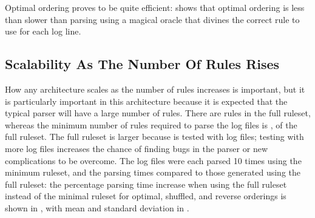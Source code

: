 Optimal ordering proves to be quite efficient:  shows that optimal ordering is less than
 slower than parsing
using a magical oracle that divines the correct rule to use for each log
line.






\FloatBarrier{}

\subsection{Scalability As The Number Of Rules Rises}

\label{scalability as the number of rules rises}

How any architecture scales as the number of rules increases is important,
but it is particularly important in this architecture because it is
expected that the typical parser will have a large number of rules.  There
are \numberOFrules{} rules in the full \parsername{} ruleset, whereas the
minimum number of rules required to parse the \numberOFlogFILES{} log files
is \numberOFrulesMINIMUM{}, \numberOFrulesMINIMUMpercentage{} of the full
ruleset.  The full ruleset is larger because \parsername{} is tested with
\numberOFlogFILESall{} log files; testing with more log files increases the
chance of finding bugs in the parser or new complications to be overcome.
The \numberOFlogFILES{} log files were each parsed 10 times using the
minimum ruleset, and the parsing times compared to those generated using
the full ruleset: the percentage parsing time increase when using the full
ruleset instead of the minimal ruleset for optimal, shuffled, and reverse
orderings is shown in , with mean and standard
deviation in .


